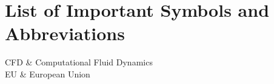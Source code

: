 \chapter*{List of Important Symbols and Abbreviations}

\begin{symbols}
    CFD    & Computational Fluid Dynamics \\
    EU     & European Union \\
\end{symbols}
